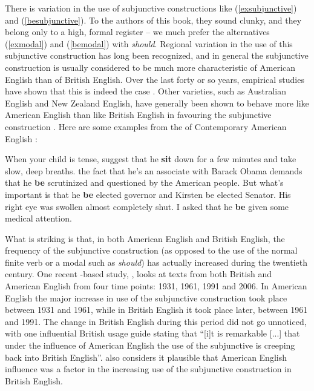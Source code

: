 There is variation in the use of subjunctive constructions like (\ref{exsubjunctive}) and (\ref{besubjunctive}). To the authors of this book, they sound clunky, and they belong only to a high, formal register -- we much prefer the alternatives (\ref{exmodal}) and (\ref{bemodal}) with \textit{should}. Regional variation in the use of this subjunctive construction has long been recognized, and in general the subjunctive construction is usually considered to be much more characteristic of American English than of British English. Over the last forty or so years, empirical studies have shown that this is indeed the case \citep{Johansson1980,Algeo1992,Oevergaard1995,Hundt1998mandative,Hundt1998book,Hundt2009,LeechEtal2009}. Other varieties, such as Australian English and New Zealand English, have generally been shown to behave more like American English than like British English in favouring the subjunctive construction \citep{Hundt1998mandative,Hundt1998book,Peters1998,Peters2009}. Here are some examples from the  of Contemporary American English \citep{Davies2008}:

\begin{exe}
\ex When your child is tense, suggest that he \textbf{sit} down for a few minutes and take slow, deep breaths.
\ex the fact that he's an associate with Barack Obama demands that he \textbf{be} scrutinized and questioned by the American people.
\ex But what's important is that he \textbf{be} elected governor and Kirsten be elected Senator.
\ex His right eye was swollen almost completely shut. I asked that he \textbf{be} given some medical attention.
\end{exe}

\noindent What is striking is that, in both American English and British English, the frequency of the subjunctive construction (as opposed to the use of the normal finite verb or a modal such as \textit{should}) has actually increased during the twentieth century. One recent -based study, \citet{Waller2017}, looks at texts from both British and American English from four time points: 1931, 1961, 1991 and 2006. In American English the major increase in use of the subjunctive construction took place between 1931 and 1961, while in British English it took place later, between 1961 and 1991. The change in British English during this period did not go unnoticed, with one influential British usage guide \citep[139]{Gowers1986} stating that ``[i]t is remarkable [...] that under the influence of American English the use of the subjunctive is creeping back into British English''. \citet{Waller2017} also considers it plausible that American English influence was a factor in the increasing use of the subjunctive construction in British English.

